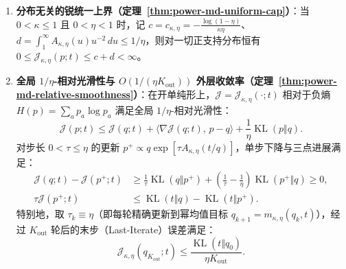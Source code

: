 \documentclass[lang=cn,scheme=chinese,openany]{../book/elegantbook}
\newcommand{\KL}{\operatorname{KL}}
\begin{document}
\begin{theorem}
\begin{enumerate}
\begin{equation}
 \boxed{\mathcal J_{1,\eta}(p;t)
 =\frac{(1-\eta)\KL(p\Vert M)+\eta\KL(t\Vert M)}{\eta(1-\eta)}.}
 \label{eq:power-md-js-endpoint}
\end{equation}
\item \textbf{分布无关的锐统一上界（定理~\ref{thm:power-md-uniform-cap}）}：当 $0<\kappa\le 1$ 且 $0<\eta<1$ 时，记 $c=c_{\kappa,\eta}=-\frac{\log(1-\eta)}{\kappa\eta}$、$d=\int_1^\infty A_{\kappa,\eta}(u)u^{-2}\,du\le 1/\eta$，则对一切正支持分布恒有 $0\le\mathcal J_{\kappa,\eta}(p;t)\le c+d<\infty$。
\item \textbf{全局 $1/\eta$-相对光滑性与 $O(1/(\eta K_{\mathrm{out}}))$ 外层收敛率（定理~\ref{thm:power-md-relative-smoothness}）}：在开单纯形上，$\mathcal J=\mathcal J_{\kappa,\eta}(\cdot;t)$ 相对于负熵 $H(p)=\sum_a p_a\log p_a$ 满足全局 $1/\eta$-相对光滑性：
\begin{equation}
 \mathcal J(p;t)\le\mathcal J(q;t)+\bigl\langle\nabla\mathcal J(q;t),\,p-q\bigr\rangle
       +\frac1\eta\KL(p\Vert q).
 \label{eq:power-md-relative-smoothness}
\end{equation}
对步长 $0<\tau\le\eta$ 的更新 $p^+\propto q\exp[\tau A_{\kappa,\eta}(t/q)]$，单步下降与三点进展满足：
\begin{align}
 \mathcal J(q;t)-\mathcal J(p^+;t)
 &\ge\frac1\tau\KL(q\Vert p^+)
  +\left(\frac1\tau-\frac1\eta\right)\KL(p^+\Vert q)\ge 0,\\
 \tau\mathcal J(p^+;t)
 &\le\KL(t\Vert q)-\KL(t\Vert p^+).
 \label{eq:power-md-single-step-progress}
\end{align}
特别地，取 $\tau_k\equiv\eta$（即每轮精确更新到幂均值目标 $q_{k+1}=m_{\kappa,\eta}(q_k,t)$），经过 $K_{\mathrm{out}}$ 轮后的末步（Last-Iterate）误差满足：
\begin{equation}
 \mathcal J_{\kappa,\eta}(q_{K_{\mathrm{out}}};t)\le
 \frac{\KL(t\Vert q_0)}{\eta K_{\mathrm{out}}}.
 \label{eq:power-md-last-iterate-rate}
\end{equation}
\end{enumerate}
\end{theorem}
\end{document}
